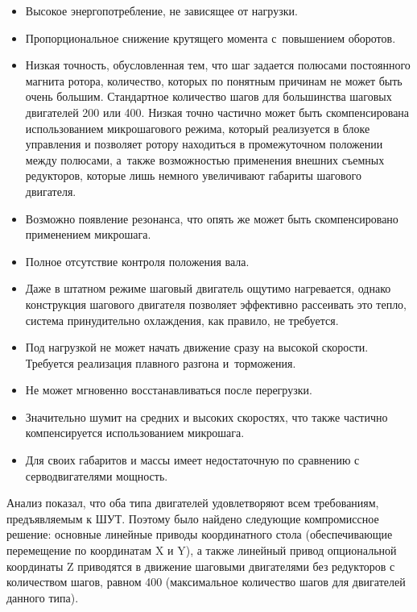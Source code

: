 \begin{itemize}
	\item Высокое энергопотребление, не зависящее от нагрузки.
	
	\item Пропорциональное снижение крутящего момента с~повышением оборотов.
	
	\item Низкая точность, обусловленная тем, что шаг задается полюсами постоянного магнита ротора, количество, которых по понятным причинам не может быть очень большим. Стандартное количество шагов для большинства шаговых двигателей 200 или 400. Низкая точно частично может быть скомпенсирована использованием микрошагового режима, который реализуется в блоке управления и позволяет ротору находиться в промежуточном положении между полюсами, а~также возможностью применения внешних съемных редукторов, которые лишь немного увеличивают габариты шагового двигателя.
	
	\item Возможно появление резонанса, что опять же может быть скомпенсировано применением микрошага.
	
	\item Полное отсутствие контроля положения вала.
	
	\item Даже в штатном режиме шаговый двигатель ощутимо нагревается, однако конструкция шагового двигателя позволяет эффективно рассеивать это тепло, система принудительно охлаждения, как правило, не требуется.
	
	\item Под нагрузкой не может начать движение сразу на высокой скорости. Требуется реализация плавного разгона и~торможения.
	
	\item Не может мгновенно восстанавливаться после перегрузки.
	
	\item Значительно шумит на средних и высоких скоростях, что также частично компенсируется использованием микрошага.
	
	\item Для своих габаритов и массы имеет недостаточную по сравнению с серводвигателями мощность.
\end{itemize}

Анализ показал, что оба типа двигателей удовлетворяют всем требованиям, предъявляемым к ШУТ. Поэтому было найдено следующие компромиссное решение: основные линейные приводы координатного стола (обеспечивающие перемещение по координатам X и Y), а также линейный привод опциональной координаты Z приводятся в движение шаговыми двигателями без редукторов с количеством шагов, равном 400 (максимальное количество шагов для двигателей данного типа).

